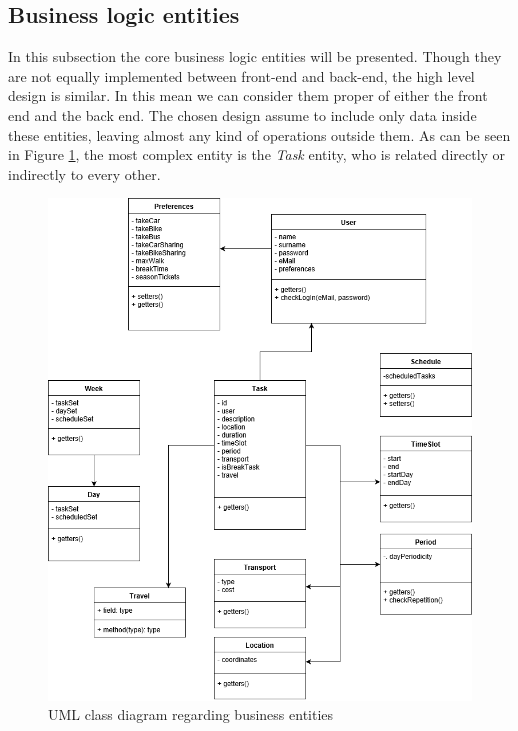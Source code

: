 \subsection{Business logic entities}
\label{sec:businessEntities}
In this subsection the core business logic entities will be presented. Though they are not equally implemented between front-end and back-end, the high level design is similar. In this mean we can consider them proper of either the front end and the back end. The chosen design assume to include only data inside these entities, leaving almost any kind of operations outside them. As can be seen in Figure \ref{component:entity_diag}, the most complex entity is the \emph{Task} entity, who is related directly or indirectly to every other.
\begin{figure}[H]
    \centering
    \includegraphics[scale=0.4]{Pictures/ComponentDiagram/EntityDiagram.png}
    \caption{UML class diagram regarding business entities}
    \label{component:entity_diag}
\end{figure}
